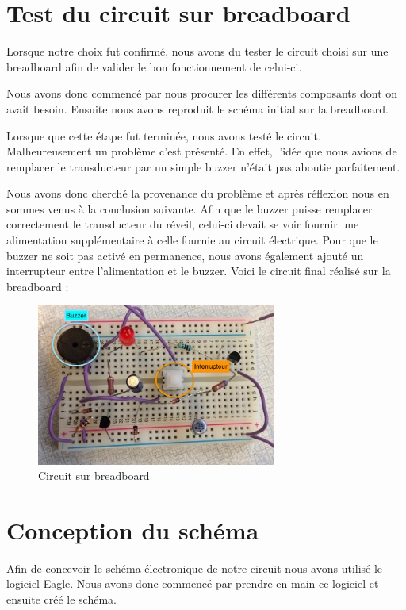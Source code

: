\chapter{Test du circuit sur breadboard}

Lorsque notre choix fut confirmé, nous avons du tester le circuit choisi sur une breadboard afin de valider le bon fonctionnement de celui-ci. 

Nous avons donc commencé par nous procurer les différents composants dont on avait besoin. Ensuite nous avons reproduit le schéma initial sur la breadboard.

Lorsque que cette étape fut terminée, nous avons testé le circuit. Malheureusement un problème c'est présenté. En effet, l'idée que nous avions de remplacer le transducteur par un simple buzzer n'était pas aboutie parfaitement. 

Nous avons donc cherché la provenance du problème et après réflexion nous en sommes venus à la conclusion suivante. Afin que le buzzer puisse remplacer correctement le transducteur du réveil, celui-ci devait se voir fournir une alimentation supplémentaire à celle fournie au circuit électrique. Pour que le buzzer ne soit pas activé en permanence, nous avons également ajouté un interrupteur entre l'alimentation et le buzzer. Voici le circuit final réalisé sur la breadboard : 

\begin{figure}[H]
\centering
\includegraphics[width=0.7\textwidth]{ressources/breadboardElement}
\caption{Circuit sur breadboard}
\end{figure}



\chapter{Conception du schéma}

Afin de concevoir le schéma électronique de notre circuit nous avons utilisé le logiciel Eagle. Nous avons donc commencé par prendre en main ce logiciel et ensuite créé le schéma.  

